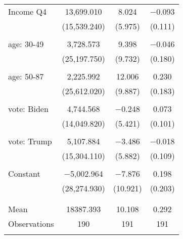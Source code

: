 \begin{tabular}{@{\extracolsep{5pt}}lccc}
 Income Q4 & 13,699.010 & 8.024 & $-$0.093 \\ 
  & (15,539.240) & (5.975) & (0.111) \\ 
  & & & \\ 
 age: 30-49 & 3,728.573 & 9.398 & $-$0.046 \\ 
  & (25,197.750) & (9.732) & (0.180) \\ 
  & & & \\ 
 age: 50-87 & 2,225.992 & 12.006 & 0.230 \\ 
  & (25,612.020) & (9.887) & (0.183) \\ 
  & & & \\ 
 vote: Biden & 4,744.568 & $-$0.248 & 0.073 \\ 
  & (14,049.820) & (5.421) & (0.101) \\ 
  & & & \\ 
 vote: Trump & 5,107.884 & $-$3.486 & $-$0.018 \\ 
  & (15,304.110) & (5.882) & (0.109) \\ 
  & & & \\ 
 Constant & $-$5,002.964 & $-$7.876 & 0.198 \\ 
  & (28,274.930) & (10.921) & (0.203) \\ 
  & & & \\ 
\hline \\[-1.8ex] 
Mean & 18387.393 & 10.108 & 0.292 \\ 
Observations & 190 & 191 & 191 \\ 
\hline 
\hline \\[-1.8ex] 
\end{tabular} 
